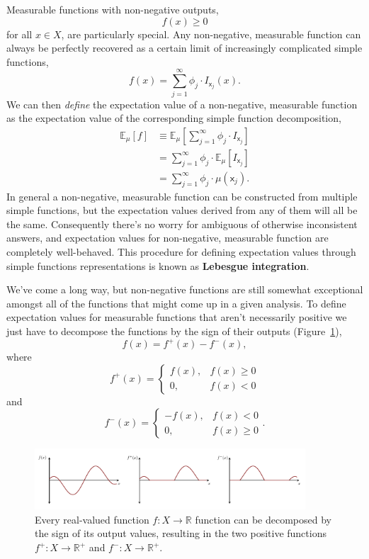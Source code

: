 \documentclass[
  letterpaper,
  DIV=11,
  numbers=noendperiod]{scrartcl}
\begin{document}
Measurable functions with non-negative outputs, \[
f(x) \ge 0
\] for all \(x \in X\), are particularly special. Any non-negative,
measurable function can always be perfectly recovered as a certain limit
of increasingly complicated simple functions, \[
f(x) = \sum_{j = 1}^{\infty} \phi_{j} \cdot I_{\mathsf{x}_{j}}(x).
\] We can then \emph{define} the expectation value of a non-negative,
measurable function as the expectation value of the corresponding simple
function decomposition, \begin{align*}
\mathbb{E}_{\mu}[f]
&\equiv
\mathbb{E}_{\mu} \left[
\sum_{j = 1}^{\infty} \phi_{j} \cdot I_{\mathsf{x}_{j}} \right]
\\
&=
\sum_{j = 1}^{\infty} \phi_{j} \cdot
\mathbb{E}_{\mu} \left[I_{\mathsf{x}_{j}} \right]
\\
&=
\sum_{j = 1}^{\infty} \phi_{j} \cdot
\mu(\mathsf{x}_{j}).
\end{align*} In general a non-negative, measurable function can be
constructed from multiple simple functions, but the expectation values
derived from any of them will all be the same. Consequently there's no
worry for ambiguous of otherwise inconsistent answers, and expectation
values for non-negative, measurable function are completely
well-behaved. This procedure for defining expectation values through
simple functions representations is known as \textbf{Lebesgue
integration}.

We've come a long way, but non-negative functions are still somewhat
exceptional amongst all of the functions that might come up in a given
analysis. To define expectation values for measurable functions that
aren't necessarily positive we just have to decompose the functions by
the sign of their outputs (Figure~\ref{fig-sign-decomposition}), \[
f(x) = f^{+}(x) - f^{-}(x),
\] where \[
f^{+} (x) =
\left\{
\begin{array}{rr}
f(x), & f(x) \ge 0 \\
0, & f(x) < 0
\end{array}
\right.
\] and \[
f^{-} (x) =
\left\{
\begin{array}{rr}
- f(x), & f(x) < 0 \\
0, & f(x) \ge 0
\end{array}
\right. .
\]

\begin{figure}

{\centering \includegraphics[width=0.9\textwidth,height=\textheight]{figures/sign_decomposition/sign_decomposition.pdf}

}

\caption{\label{fig-sign-decomposition}Every real-valued function
\(f: X \rightarrow \mathbb{R}\) function can be decomposed by the sign
of its output values, resulting in the two positive functions
\(f^{+}: X \rightarrow \mathbb{R}^{+}\) and
\(f^{-}: X \rightarrow \mathbb{R}^{+}\).}

\end{figure}
\end{document}
